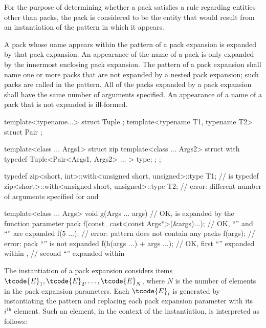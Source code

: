 \pnum
For the purpose of determining whether a pack satisfies a rule
regarding entities other than packs, the pack is
considered to be the entity that would result from an instantiation of
the pattern in which it appears.

\pnum
A pack whose name appears within the pattern of a pack
expansion is expanded by that pack expansion. An appearance of the name of
a pack is only expanded by the innermost enclosing pack expansion.
The pattern of a pack expansion shall name one or more packs that
are not expanded by a nested pack expansion; such packs are called
 in the pattern. All of the packs expanded
by a pack expansion shall have the same number of arguments specified. An
appearance of a name of a pack that is not expanded is
ill-formed.
\begin{example}
\begin{codeblock}
template<typename...> struct Tuple {};
template<typename T1, typename T2> struct Pair {};

template<class ... Args1> struct zip {
  template<class ... Args2> struct with {
    typedef Tuple<Pair<Args1, Args2> ... > type;
  };
};

typedef zip<short, int>::with<unsigned short, unsigned>::type T1;
    //  is 
typedef zip<short>::with<unsigned short, unsigned>::type T2;
    // error: different number of arguments specified for  and 

template<class ... Args>
  void g(Args ... args) {                   // OK,  is expanded by the function parameter pack 
    f(const_cast<const Args*>(&args)...);   // OK, ``'' and ``'' are expanded
    f(5 ...);                               // error: pattern does not contain any packs
    f(args);                                // error: pack ``'' is not expanded
    f(h(args ...) + args ...);              // OK, first ``'' expanded within ,
                                            // second ``'' expanded within 
  }
\end{codeblock}
\end{example}

\pnum
The instantiation of a pack expansion considers
items $\tcode{E}_1, \tcode{E}_2, \dotsc, \tcode{E}_N$,
where
$N$ is the number of elements in the pack expansion parameters.
Each $\tcode{E}_i$ is generated by instantiating the pattern and
replacing each pack expansion parameter with its $i^\text{th}$ element.
Such an element, in the context of the instantiation, is interpreted as
follows:

